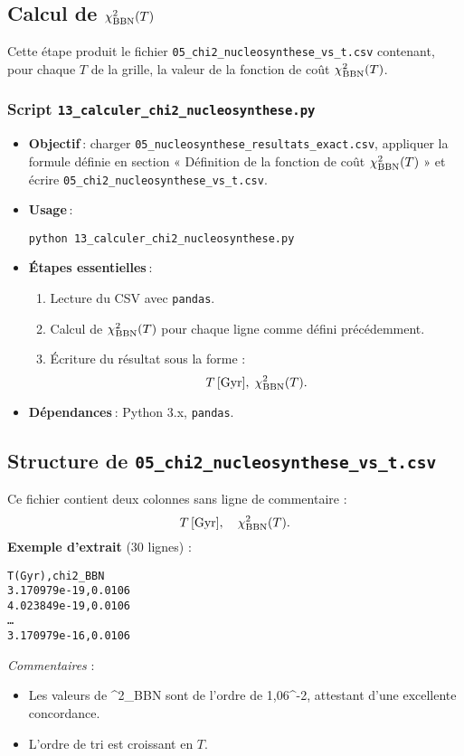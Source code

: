 \subsection{Calcul de \(\chi^{2}_{\rm BBN}(T)\)}

Cette étape produit le fichier \texttt{05\_chi2\_nucleosynthese\_vs\_t.csv} contenant, pour chaque \(T\) de la grille, la valeur de la fonction de coût \(\chi^{2}_{\rm BBN}(T)\).

\subsubsection*{Script \texttt{13\_calculer\_chi2\_nucleosynthese.py}}

\begin{itemize}
  \item \textbf{Objectif} : charger \texttt{05\_nucleosynthese\_resultats\_exact.csv}, appliquer la formule définie en section « Définition de la fonction de coût \(\chi^{2}_{\rm BBN}(T)\) » et écrire \texttt{05\_chi2\_nucleosynthese\_vs\_t.csv}.
  \item \textbf{Usage} :
    \begin{verbatim}
python 13_calculer_chi2_nucleosynthese.py
    \end{verbatim}
  \item \textbf{Étapes essentielles} :
    \begin{enumerate}
      \item Lecture du CSV avec \texttt{pandas}.  
      \item Calcul de \(\chi^{2}_{\rm BBN}(T)\) pour chaque ligne comme défini précédemment.  
      \item Écriture du résultat sous la forme :
        \[
          T\,[\mathrm{Gyr}],\;\chi^{2}_{\rm BBN}(T).
        \]
    \end{enumerate}

  \item \textbf{Dépendances} : Python 3.x, \texttt{pandas}.
\end{itemize}

\subsection{Structure de \texttt{05\_chi2\_nucleosynthese\_vs\_t.csv}}
Ce fichier contient deux colonnes sans ligne de commentaire :
\[
  T\,[\mathrm{Gyr}],\quad \chi^{2}_{\rm BBN}(T).
\]
\noindent\textbf{Exemple d’extrait} (30 lignes) :
\begin{verbatim}
T(Gyr),chi2_BBN
3.170979e-19,0.0106
4.023849e-19,0.0106
…
3.170979e-16,0.0106
\end{verbatim}
\noindent\emph{Commentaires} :
\begin{itemize}
  \item Les valeurs de \chi^{2}_{\rm BBN} sont de l’ordre de 1,06^{-2}, attestant d’une excellente concordance.
  \item L’ordre de tri est croissant en \(T\).
\end{itemize}

